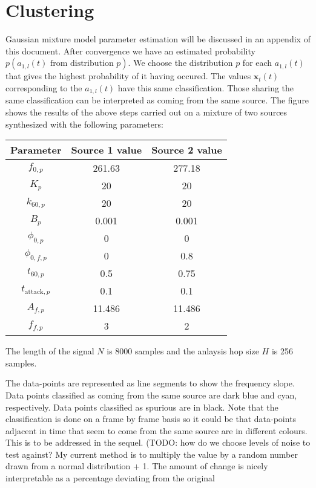 \section{Clustering}
Gaussian mixture model parameter estimation will be discussed in an appendix of
this document. After convergence we have an estimated probability
$p(a_{1,l}(t) \text{ from distribution }p)$. We choose the
distribution $p$ for each $a_{1,l}(t)$ that gives the highest probability of it
having occured. The values $\mathbf{x}_{t}(t)$ corresponding to the $a_{1,l}(t)$
have this same classification. Those sharing the same classification can be
interpreted as coming from the same source. The figure shows the results of the
above steps carried out on a mixture of two sources synthesized with the
following parameters:
\begin{table}
    \begin{center}
        \begin{tabular}{c c c }
            Parameter & Source 1 value & Source 2 value \\
            \hline
            $f_{0,p}$ & 261.63 & 277.18 \\
            $K_{p}$ & 20 & 20 \\
            $k_{60,p}$ & 20 & 20 \\
            $B_{p}$ & 0.001 & 0.001 \\
            $\phi_{0,p}$ & 0 & 0 \\
            $\phi_{0,f,p}$ & 0 & 0.8 \\
            $t_{60,p}$ & 0.5 & 0.75 \\
            $t_{\text{attack},p}$ & 0.1 & 0.1 \\
            $A_{f,p}$ & 11.486 & 11.486 \\
            $f_{f,p}$ & 3 & 2
        \end{tabular}
    \end{center}
\end{table}
The length of the signal $N$ is 8000 samples and the anlaysis hop size $H$ is 256
samples.


The data-points are represented as line segments to show the frequency slope.
Data points classified as coming from the same source are dark blue and cyan,
respectively.  Data points classified as spurious are in black. Note that the
classification is done on a frame by frame basis so it could be that data-points
adjacent in time that seem to come from the same source are in different
colours. This is to be addressed in the sequel.
(TODO: how do we choose levels of noise to test against? My current method is to
multiply the value by a random number drawn from a normal distribution + 1. The amount
of change is nicely interpretable as a percentage deviating from the original

